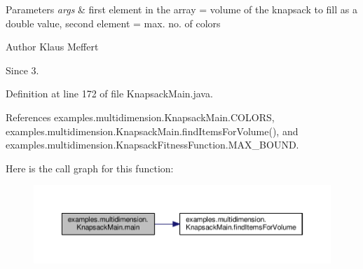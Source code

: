 \begin{DoxyParams}{Parameters}
{\em args} & first element in the array = volume of the knapsack to fill as a double value, second element = max. no. of colors\\
\hline
\end{DoxyParams}
\begin{DoxyAuthor}{Author}
Klaus Meffert 
\end{DoxyAuthor}
\begin{DoxySince}{Since}
3. 
\end{DoxySince}


Definition at line 172 of file Knapsack\-Main.\-java.



References examples.\-multidimension.\-Knapsack\-Main.\-C\-O\-L\-O\-R\-S, examples.\-multidimension.\-Knapsack\-Main.\-find\-Items\-For\-Volume(), and examples.\-multidimension.\-Knapsack\-Fitness\-Function.\-M\-A\-X\-\_\-\-B\-O\-U\-N\-D.



Here is the call graph for this function\-:
\nopagebreak
\begin{figure}[H]
\begin{center}
\leavevmode
\includegraphics[width=350pt]{classexamples_1_1multidimension_1_1_knapsack_main_a003d2df1aa5de1905c1fe77ebb68f8ec_cgraph}
\end{center}
\end{figure}




